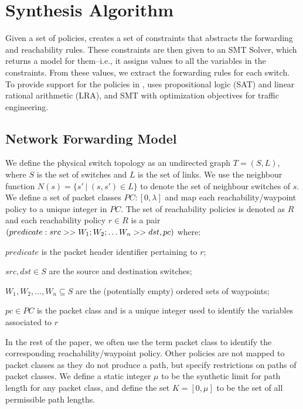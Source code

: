 \section{Synthesis Algorithm} \label{sec:synthesisalgo}
Given a set of policies, \Name creates a set of constraints 
that abstracts the forwarding and reachability rules. 
These constraints are then given to an SMT Solver, which returns a model 
for them--i.e., it assigns values to all the variables in the constraints. From these values, we extract the forwarding rules for each switch.
To provide support for the policies in , \name uses propositional logic (SAT) and linear rational arithmetic (LRA),
and SMT with optimization objectives for traffic engineering.
\subsection{Network Forwarding Model} \label{sec:fwdmodel}
We define the physical switch topology as an undirected graph $T=(S, L)$,
where $S$ is the set of switches and $L$ is the set of links. 
We use the neighbour function $N(s) = \{s'\ | \ (s,s') \in L \}$ to denote 
the set of neighbour switches of $s$. 
We define a set of packet classes $PC : [0,\lambda]$ and map each reachability/waypoint policy to a unique integer in $PC$.
The set of reachability policies is denoted as $R$ and each reachability policy $r \in R$ is
a pair
$(predicate :\newline src >> W_1;W_2; \ldots W_n >> dst, pc)$
where:
\begin{compactitemize}
\item  $predicate$ is the packet header identifier pertaining to $r$;
\item  $src,dst \in S$ are the source and destination switches;
\item $W_1, W_2, \ldots, W_n \subseteq S$ are the (potentially empty) ordered sets of waypoints; 
\item $pc \in PC$ is the packet class and is a unique integer used to identify the variables associated to $r$
\end{compactitemize} 
In the rest of the paper, we often use the term packet class to identify the corresponding reachability/waypoint policy. 
Other policies are not mapped to packet classes as they do not produce a path, but specify restrictions on paths of packet classes. 
We define a static integer $\mu$ to be the synthetic limit for path length for any packet class, and define the set $K = [0, \mu]$ to be the set of all permissible path lengths.

